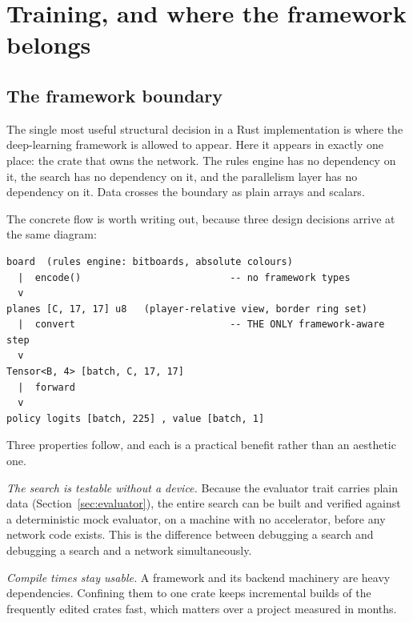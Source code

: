 \section{Training, and where the framework belongs}
\label{sec:training}

\subsection{The framework boundary}
\label{sec:framework-boundary}

The single most useful structural decision in a Rust implementation is where the
deep-learning framework is allowed to appear. Here it appears in exactly one
place: the crate that owns the network. The rules engine has no dependency on it,
the search has no dependency on it, and the parallelism layer has no dependency
on it. Data crosses the boundary as plain arrays and scalars.

The concrete flow is worth writing out, because three design decisions arrive at
the same diagram:

\begin{lstlisting}[style=plaintext,caption={The only framework-aware seam in the
system. Everything above the dotted line compiles and runs with no accelerator
present.},label={lst:seam}]
board  (rules engine: bitboards, absolute colours)
  |  encode()                          -- no framework types
  v
planes [C, 17, 17] u8   (player-relative view, border ring set)
  |  convert                           -- THE ONLY framework-aware step
  v
Tensor<B, 4> [batch, C, 17, 17]
  |  forward
  v
policy logits [batch, 225] , value [batch, 1]
\end{lstlisting}

Three properties follow, and each is a practical benefit rather than an aesthetic
one.

\emph{The search is testable without a device.} Because the evaluator trait
carries plain data (Section~\ref{sec:evaluator}), the entire search can be built
and verified against a deterministic mock evaluator, on a machine with no
accelerator, before any network code exists. This is the difference between
debugging a search and debugging a search and a network simultaneously.

\emph{Compile times stay usable.} A framework and its backend machinery are heavy
dependencies. Confining them to one crate keeps incremental builds of the
frequently edited crates fast, which matters over a project measured in months.

